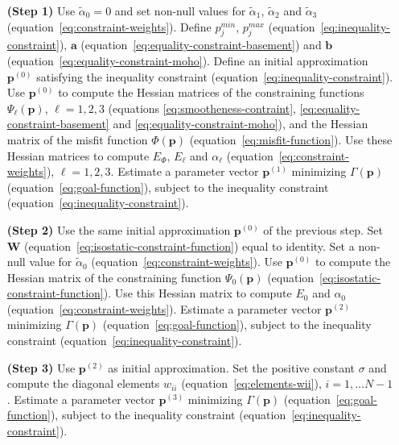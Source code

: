 \documentclass[manuscript]{geophysics}
\begin{document}
\begin{enumerate}
	\item [\textbf{(Step 1)}] Use $\tilde{\alpha}_{0} = 0$ and set non-null values for $\tilde{\alpha}_{1}$, $\tilde{\alpha}_{2}$ and $\tilde{\alpha}_{3}$ (equation~\ref{eq:constraint-weights}).
	Define $p_{j}^{min}$, $p_{j}^{max}$ (equation~\ref{eq:inequality-constraint}),
	$\mathbf{a}$ (equation~\ref{eq:equality-constraint-basement}) and
	$\mathbf{b}$ (equation~\ref{eq:equality-constraint-moho}).
	Define an initial approximation $\mathbf{p}^{(0)}$ satisfying the inequality constraint
	(equation~\ref{eq:inequality-constraint}). Use $\mathbf{p}^{(0)}$ to compute the Hessian
	matrices of the constraining functions $\Psi_{\ell}(\mathbf{p})$, $\ell = 1, 2, 3$ (equations \ref{eq:smootheness-contraint}, \ref{eq:equality-constraint-basement} and \ref{eq:equality-constraint-moho}), and the Hessian matrix of the misfit function
	$\Phi(\mathbf{p})$ (equation~\ref{eq:misfit-function}). Use these Hessian matrices to
	compute $E_{\Phi}$, $E_{\ell}$ and $\alpha_{\ell}$ (equation~\ref{eq:constraint-weights}),
	$\ell = 1, 2, 3$. Estimate a parameter vector $\mathbf{p}^{(1)}$
	minimizing $\Gamma(\mathbf{p})$ (equation~\ref{eq:goal-function}), 
	subject to the inequality constraint (equation~\ref{eq:inequality-constraint}).
	\item [\textbf{(Step 2)}] Use the same initial approximation $\mathbf{p}^{(0)}$
	of the previous step. Set $\mathbf{W}$ (equation~\ref{eq:isostatic-constraint-function})
	equal to identity. Set a non-null value for $\tilde{\alpha}_{0}$
	(equation~\ref{eq:constraint-weights}). 
	Use $\mathbf{p}^{(0)}$ to compute the Hessian matrix of the constraining function
	$\Psi_{0}(\mathbf{p})$ (equation~\ref{eq:isostatic-constraint-function}). Use this 
	Hessian matrix to compute $E_{0}$ and $\alpha_{0}$ (equation~\ref{eq:constraint-weights}).
	Estimate a parameter vector $\mathbf{p}^{(2)}$ minimizing $\Gamma(\mathbf{p})$ (equation~\ref{eq:goal-function}), subject to the inequality constraint 
	(equation~\ref{eq:inequality-constraint}).
	\item [\textbf{(Step 3)}] Use $\mathbf{p}^{(2)}$ as initial approximation. 
	Set the positive constant $\sigma$ and compute the 
	diagonal elements $w_{ii}$ (equation~\ref{eq:elements-wii}), $i = 1, \dots N-1$.
	Estimate a parameter vector $\mathbf{p}^{(3)}$ minimizing $\Gamma(\mathbf{p})$ (equation~\ref{eq:goal-function}), subject to the inequality constraint 
	(equation~\ref{eq:inequality-constraint}).
\end{enumerate}
\end{document}
